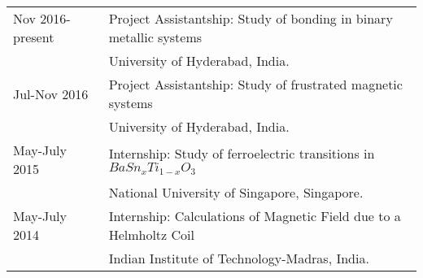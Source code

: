 \vspace{-0.5cm}
 \begin{table}[!ht]
\begin{tabular}{R{3 cm} m{14.6cm}}
{Nov 2016-present}& {\color{blue} Project Assistantship: Study of bonding in binary metallic systems} \footnotemark[1] \\ %
 & University of Hyderabad, India. \vspace{0.2 cm} \\

{Jul-Nov 2016}& {\color{blue} Project Assistantship: Study of frustrated magnetic systems} \footnotemark[1]\\
 & University of Hyderabad, India. \vspace{0.2 cm} \\
 
{May-July 2015}& {\color{blue} Internship: Study of ferroelectric transitions in $BaSn_{x}Ti_{1-x}O_{3}$} \footnotemark[1]\\
 & National University of Singapore, Singapore. \vspace{0.2 cm} \\
 
{May-July 2014}& {\color{blue} Internship: Calculations of Magnetic Field due to a Helmholtz Coil} \footnotemark[1] \\
 &Indian Institute of Technology-Madras, India.\vspace{0.2 cm} \\
 

\end{tabular}
\end{table}
